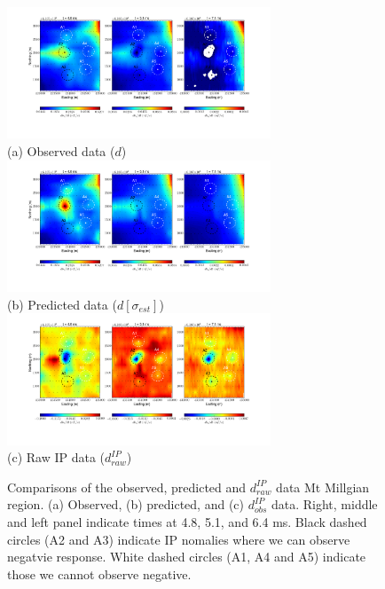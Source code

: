 \documentclass[letterpaper,11pt]{article}
\newcommand{\dip}{d^{IP}}
\begin{document}
\begin{figure}[htb]
  \centering
  \includegraphics[width=0.7\textwidth]{figures/OBS_field.png}\\ (a) Observed data ($d$) \\
  \includegraphics[width=0.7\textwidth]{figures/FUND_field.png}\\ (b) Predicted data ($d[\sigma_{est}]$)\\
  \includegraphics[width=0.7\textwidth]{figures/dIP_field.png} \\ (c) Raw IP data ($\dip_{raw}$)
  \caption{Comparisons of the observed, predicted and $\dip_{raw}$ data Mt Millgian region. (a) Observed, (b) predicted, and (c) $\dip_{obs}$ data. Right, middle and left panel indicate times at 4.8, 5.1, and 6.4 ms. Black dashed circles (A2 and A3) indicate IP nomalies where we can observe negatvie response. White dashed circles (A1, A4 and A5) indicate those we cannot observe negative.}
  \label{Fig:response_field}
\end{figure}
\end{document}
